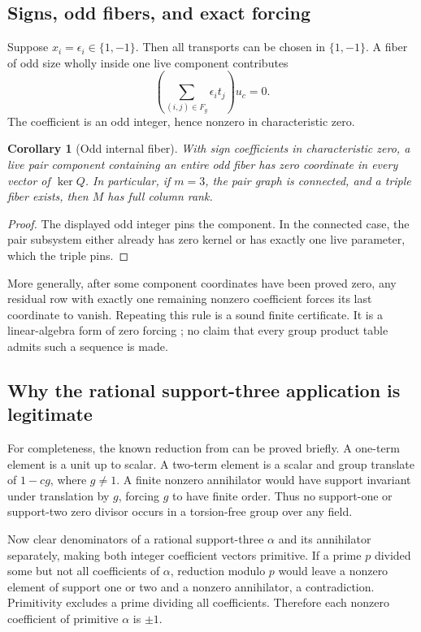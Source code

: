 \documentclass[11pt,a4paper,oneside]{report}
\newtheorem{corollary}[theorem]{Corollary}
\theoremstyle{definition}
\theoremstyle{remark}
\begin{document}
\subsection{Signs, odd fibers, and exact forcing}
Suppose \(x_i=\epsilon_i\in\{1,-1\}\). Then all transports can be chosen in \(\{1,-1\}\). A fiber of odd size wholly inside one live component contributes
\[
\left(\sum_{(i,j)\in F_g}\epsilon_i t_j\right)u_c=0.
\]
The coefficient is an odd integer, hence nonzero in characteristic zero.
\begin{corollary}[Odd internal fiber]\label{M02:cor:odd}
With sign coefficients in characteristic zero, a live pair component containing an entire odd fiber has zero coordinate in every vector of \(\ker Q\). In particular, if \(m=3\), the pair graph is connected, and a triple fiber exists, then \(M\) has full column rank.
\end{corollary}
\begin{proof}
The displayed odd integer pins the component. In the connected case, the pair subsystem either already has zero kernel or has exactly one live parameter, which the triple pins.
\end{proof}
More generally, after some component coordinates have been proved zero, any residual row with exactly one remaining nonzero coefficient forces its last coordinate to vanish. Repeating this rule is a sound finite certificate. It is a linear-algebra form of zero forcing \cite{B:AIM}; no claim that every group product table admits such a sequence is made.

\subsection{Why the rational support-three application is legitimate}
For completeness, the known reduction from \cite[Theorem 1.1]{B:ATrational} can be proved briefly. A one-term element is a unit up to scalar. A two-term element is a scalar and group translate of \(1-cg\), where \(g\ne1\). A finite nonzero annihilator would have support invariant under translation by \(g\), forcing \(g\) to have finite order. Thus no support-one or support-two zero divisor occurs in a torsion-free group over any field.

Now clear denominators of a rational support-three \(\alpha\) and its annihilator separately, making both integer coefficient vectors primitive. If a prime \(p\) divided some but not all coefficients of \(\alpha\), reduction modulo \(p\) would leave a nonzero element of support one or two and a nonzero annihilator, a contradiction. Primitivity excludes a prime dividing all coefficients. Therefore each nonzero coefficient of primitive \(\alpha\) is \(\pm1\).
\end{document}
